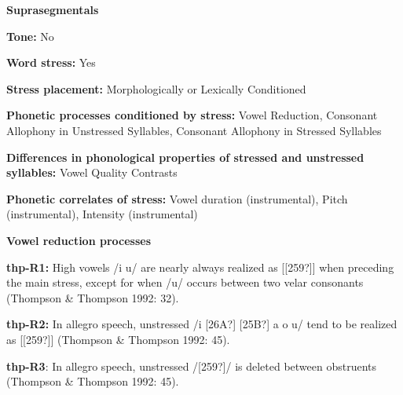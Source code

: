 \begin{styleBody}
\textbf{Suprasegmentals}
\end{styleBody}

\begin{styleBody}
\textbf{Tone:} No
\end{styleBody}

\begin{styleBody}
\textbf{Word stress:} Yes
\end{styleBody}

\begin{styleBody}
\textbf{Stress placement:} Morphologically or Lexically Conditioned
\end{styleBody}

\begin{styleBody}
\textbf{Phonetic processes conditioned by stress:} Vowel Reduction, Consonant Allophony in Unstressed Syllables, Consonant Allophony in Stressed Syllables
\end{styleBody}

\begin{styleBody}
\textbf{Differences in phonological properties of stressed and unstressed syllables:} Vowel Quality Contrasts
\end{styleBody}

\begin{styleBody}
\textbf{Phonetic correlates of stress: }Vowel duration (instrumental), Pitch (instrumental), Intensity (instrumental)
\end{styleBody}

\begin{styleBody}
\textbf{Vowel reduction processes}
\end{styleBody}

\begin{styleBody}
\textbf{thp-R1: }High vowels /i u/ are nearly always realized as [[259?]] when preceding the main stress, except for when /u/ occurs between two velar consonants (Thompson \& Thompson 1992: 32).
\end{styleBody}

\begin{styleBody}
\textbf{thp-R2:} In allegro speech, unstressed /i [26A?] [25B?] a o u/ tend to be realized as [[259?]] (Thompson \& Thompson 1992: 45).
\end{styleBody}

\begin{styleBody}
\textbf{thp-R3}: In allegro speech, unstressed /[259?]/ is deleted between obstruents (Thompson \& Thompson 1992: 45).
\end{styleBody}


